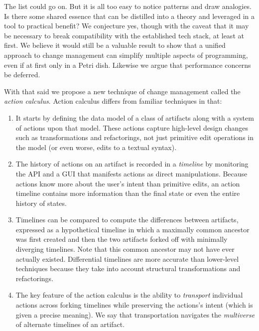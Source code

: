 \documentclass[english,submission]{programming}
\theoremstyle{definition}
\begin{document}
\medskip
The list could go on. But it is all too easy to notice patterns and draw analogies. Is there some shared essence that can be distilled into a theory and leveraged in a tool to practical benefit? We conjecture yes, though with the caveat that it may be necessary to break compatibility with the established tech stack, at least at first. We believe it would still be a valuable result to show that a unified approach to change management can  simplify multiple aspects of programming, even if at first only in a Petri dish.
Likewise we argue that performance concerns be deferred.

With that said we propose a new technique of change management called the \textit{action calculus}. Action calculus differs from familiar techniques in that:
\begin{enumerate}

  \item It starts by defining the data model of a class of artifacts along with a system of actions upon that model. These actions capture high-level design changes such as transformations and refactorings, not just primitive edit operations in the model (or even worse, edits to a textual syntax).

  \item The history of actions on an artifact is recorded in a \textit{timeline} by monitoring the API and a GUI that manifests actions as direct manipulations.
  Because actions know more about the user's intent than primitive edits, an action timeline contains more information than the final state or even the entire history of states.

  \item Timelines can be compared to compute the differences between artifacts, expressed as a hypothetical timeline in which a maximally common ancestor was first created and then the two artifacts forked off with minimally diverging timelines. Note that this common ancestor may not have ever actually existed.
  Differential timelines are more accurate than lower-level techniques because they take into account structural transformations and refactorings.

  \item The key feature of the action calculus is the ability to \textit{transport} individual actions across forking timelines while preserving the actions's intent (which is given a precise meaning).
  We say that transportation navigates the \textit{multiverse} of alternate timelines of an artifact.


\end{enumerate}
\end{document}
